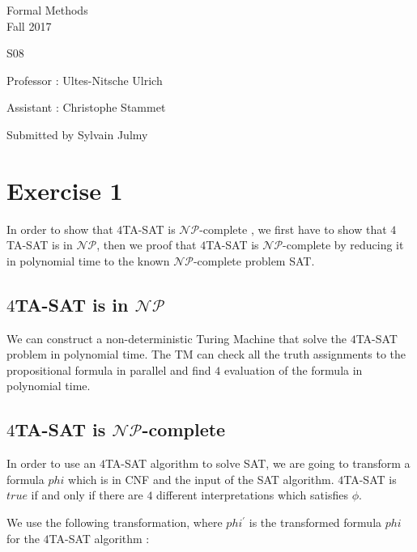 \documentclass[a4paper,11pt]{report}
\author{Sylvain Julmy}
\date{\today}
\newcommand*{\NPcp}{$\mathcal{NP}$-complete }
\begin{document}
\begin{center}
  \large{
    Formal Methods\\
    Fall 2017
  }
  
  \noindent\makebox[\linewidth]{\rule{\linewidth}{0.4pt}}
  S08
  \noindent\makebox[\linewidth]{\rule{\linewidth}{0.4pt}}

  \begin{flushleft}
    Professor : Ultes-Nitsche Ulrich

    Assistant : Christophe Stammet
  \end{flushleft}

  
  \noindent\makebox[\linewidth]{\rule{\linewidth}{0.4pt}}

  Submitted by Sylvain Julmy
  
  \noindent\makebox[\linewidth]{\rule{\textwidth}{1pt}}
\end{center}

\section*{Exercise 1}

In order to show that $4$TA-SAT is \NPcp, we first have to show that $4$TA-SAT is in
$\mathcal{NP}$, then we proof that $4$TA-SAT is \NPcp by reducing it in
polynomial time to the known \NPcp problem SAT.

\subsection*{$4$TA-SAT is in $\mathcal{NP}$}

We can construct a non-deterministic Turing Machine that solve the $4$TA-SAT
problem in polynomial time. The TM can check all the truth assignments to the
propositional formula in parallel and find $4$ evaluation of the formula in
polynomial time.

\subsection*{$4$TA-SAT is \NPcp}

In order to use an $4$TA-SAT algorithm to solve SAT, we are going to transform a
formula $phi$ which is in CNF and the input of the SAT algorithm. $4$TA-SAT is
$true$ if and only if there are $4$ different interpretations which satisfies
$\phi$.

We use the following transformation, where $phi^\prime$ is the transformed
formula $phi$ for the $4$TA-SAT algorithm :
\end{document}
